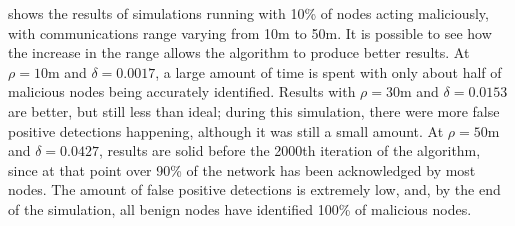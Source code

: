 
\pagebreak
{} shows the results of simulations running with 10\% of nodes acting maliciously, with communications range varying from 10m to 50m.
It is possible to see how the increase in the range allows the algorithm to produce better results.
At $\rho = 10$m and $\delta = 0.0017$, a large amount of time is spent with only about half of malicious nodes being accurately identified.
Results with $\rho = 30$m and $\delta = 0.0153$ are better, but still less than ideal; during this simulation, there were more false positive detections happening, although it was still a small amount.
At $\rho = 50$m and $\delta = 0.0427$, results are solid before the 2000th iteration of the algorithm, since at that point over 90\% of the network has been acknowledged by most nodes.
The amount of false positive detections is extremely low, and, by the end of the simulation, all benign nodes have identified 100\% of malicious nodes.

